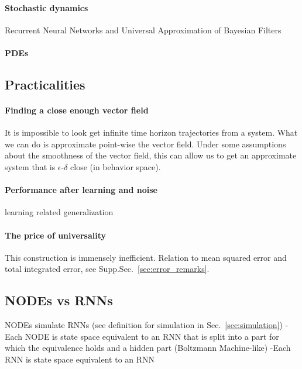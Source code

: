 \documentclass{article}
\newcounter{ct}
\begin{document}
\paragraph{Stochastic dynamics}
 \citep{gonon2019reservoir}
 \citep{hart2021echo}
 \citep{chen2022universal} 
 \citep{wei2022statistically}
Recurrent Neural Networks and Universal Approximation of Bayesian Filters  \citep{bishop2023recurrent}
 \citep{plate2024optimal}
 \citep{mishne2024elucidating}
 \citep{lipman2024flow}

\paragraph{PDEs}
 \citep{richter2022neural}


\subsection{Practicalities}
\paragraph{Finding a close enough vector field}
It is impossible to look get infinite time horizon trajectories from a system.
What we can do is approximate point-wise the vector field.
Under some assumptions about the smoothness of the vector field, this can allow us to get an approximate system that is $\epsilon$-$\delta$ close (in behavior space).

\paragraph{Performance after learning and noise}
learning related generalization  \citep{marion2023generalization} \citep{bleistein2023generalization}

\paragraph{The price of universality}
This construction is immensely inefficient.
Relation to mean squared error and total integrated error, see Supp.Sec.~\ref{sec:error_remarks}.


\subsection{NODEs vs RNNs}
NODEs simulate RNNs (see definition for simulation in Sec.~\ref{sec:simulation})
- Each NODE is state space equivalent to an RNN that is split into a part for which the equivalence holds and a hidden part (Boltzmann Machine-like)
-Each RNN is state space equivalent to an RNN
\end{document}
